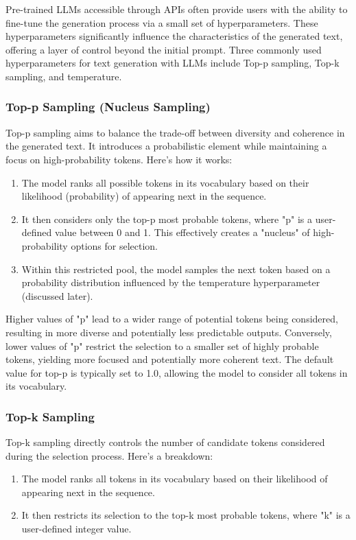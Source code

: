 \documentclass[12pt,a4paper]{report}
\begin{document}
Pre-trained LLMs accessible through APIs often provide users with the ability to fine-tune the generation process via a small set of hyperparameters. These hyperparameters significantly influence the characteristics of the generated text, offering a layer of control beyond the initial prompt. Three commonly used hyperparameters for text generation with LLMs include Top-p sampling, Top-k sampling, and temperature.


\subsubsection{Top-p Sampling (Nucleus Sampling)}

Top-p sampling aims to balance the trade-off between diversity and coherence in the generated text. It introduces a probabilistic element while maintaining a focus on high-probability tokens. Here's how it works:

\begin{enumerate}
\item{The model ranks all possible tokens in its vocabulary based on their likelihood (probability) of appearing next in the sequence.}
\item{It then considers only the top-p most probable tokens, where "p" is a user-defined value between 0 and 1. This effectively creates a "nucleus" of high-probability options for selection.}
\item{Within this restricted pool, the model samples the next token based on a probability distribution influenced by the temperature hyperparameter (discussed later).}
\end{enumerate}

Higher values of "p" lead to a wider range of potential tokens being considered, resulting in more diverse and potentially less predictable outputs. Conversely, lower values of "p" restrict the selection to a smaller set of highly probable tokens, yielding more focused and potentially more coherent text. The default value for top-p is typically set to 1.0, allowing the model to consider all tokens in its vocabulary.


\subsubsection{Top-k Sampling} 

Top-k sampling directly controls the number of candidate tokens considered during the selection process. Here's a breakdown:
\begin{enumerate}
\item{The model ranks all tokens in its vocabulary based on their likelihood of appearing next in the sequence.}
\item{It then restricts its selection to the top-k most probable tokens, where "k" is a user-defined integer value.}
\end{enumerate}
\end{document}
